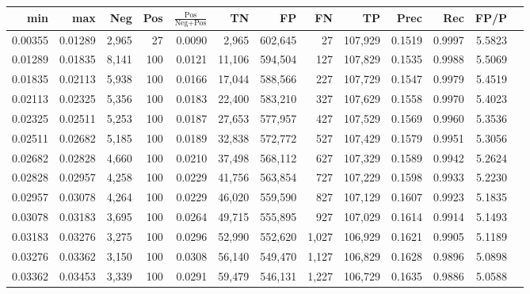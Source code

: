 \begin{tabular}{rrrrrrrrrrrrr}
\toprule
    min &     max &   Neg & Pos & $\frac{\text{Pos}}{\text{Neg}+\text{Pos}}$ &      TN &      FP &      FN &      TP &   Prec &    Rec &   FP/P \\
\midrule
0.00355 & 0.01289 & 2,965 &  27 &                                     0.0090 &   2,965 & 602,645 &      27 & 107,929 & 0.1519 & 0.9997 & 5.5823 \\
0.01289 & 0.01835 & 8,141 & 100 &                                     0.0121 &  11,106 & 594,504 &     127 & 107,829 & 0.1535 & 0.9988 & 5.5069 \\
0.01835 & 0.02113 & 5,938 & 100 &                                     0.0166 &  17,044 & 588,566 &     227 & 107,729 & 0.1547 & 0.9979 & 5.4519 \\
0.02113 & 0.02325 & 5,356 & 100 &                                     0.0183 &  22,400 & 583,210 &     327 & 107,629 & 0.1558 & 0.9970 & 5.4023 \\
0.02325 & 0.02511 & 5,253 & 100 &                                     0.0187 &  27,653 & 577,957 &     427 & 107,529 & 0.1569 & 0.9960 & 5.3536 \\
0.02511 & 0.02682 & 5,185 & 100 &                                     0.0189 &  32,838 & 572,772 &     527 & 107,429 & 0.1579 & 0.9951 & 5.3056 \\
0.02682 & 0.02828 & 4,660 & 100 &                                     0.0210 &  37,498 & 568,112 &     627 & 107,329 & 0.1589 & 0.9942 & 5.2624 \\
0.02828 & 0.02957 & 4,258 & 100 &                                     0.0229 &  41,756 & 563,854 &     727 & 107,229 & 0.1598 & 0.9933 & 5.2230 \\
0.02957 & 0.03078 & 4,264 & 100 &                                     0.0229 &  46,020 & 559,590 &     827 & 107,129 & 0.1607 & 0.9923 & 5.1835 \\
0.03078 & 0.03183 & 3,695 & 100 &                                     0.0264 &  49,715 & 555,895 &     927 & 107,029 & 0.1614 & 0.9914 & 5.1493 \\
0.03183 & 0.03276 & 3,275 & 100 &                                     0.0296 &  52,990 & 552,620 &   1,027 & 106,929 & 0.1621 & 0.9905 & 5.1189 \\
0.03276 & 0.03362 & 3,150 & 100 &                                     0.0308 &  56,140 & 549,470 &   1,127 & 106,829 & 0.1628 & 0.9896 & 5.0898 \\
0.03362 & 0.03453 & 3,339 & 100 &                                     0.0291 &  59,479 & 546,131 &   1,227 & 106,729 & 0.1635 & 0.9886 & 5.0588 \\

\end{tabular}
